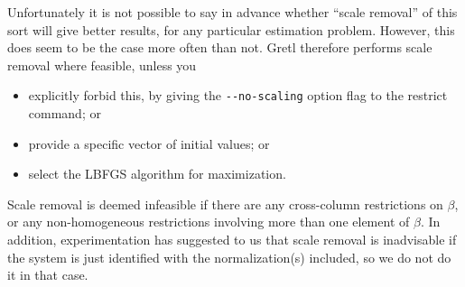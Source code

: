 Unfortunately it is not possible to say in advance whether ``scale
removal'' of this sort will give better results, for any particular
estimation problem.  However, this does seem to be the case more often
than not.  Gretl therefore performs scale removal where feasible,
unless you
\begin{itemize}
\item explicitly forbid this, by giving the \verb|--no-scaling| option
  flag to the restrict command; or
\item provide a specific vector of initial values; or
\item select the LBFGS algorithm for maximization.
\end{itemize}

Scale removal is deemed infeasible if there are any cross-column
restrictions on $\beta$, or any non-homogeneous restrictions involving
more than one element of $\beta$.  In addition, experimentation has
suggested to us that scale removal is inadvisable if the system is
just identified with the normalization(s) included, so we do not do it
in that case.

